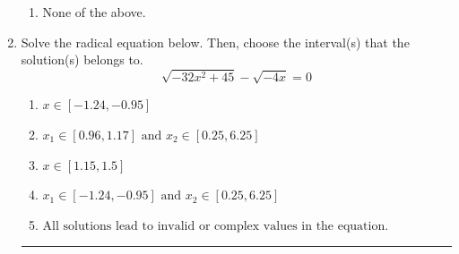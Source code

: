 \documentclass[14pt]{extbook}
\newcommand{\litem}[1]{\item#1\hspace*{-1cm}\rule{\textwidth}{0.4pt}}
\begin{document}
\begin{enumerate}
{\begin{enumerate}[label=\Alph*.]
\item None of the above.
\end{enumerate} }
\litem{
Solve the radical equation below. Then, choose the interval(s) that the solution(s) belongs to.\[ \sqrt{-32 x^2 + 45} - \sqrt{-4 x} = 0 \]\begin{enumerate}[label=\Alph*.]
\item \( x \in [-1.24,-0.95] \)
\item \( x_1 \in [0.96, 1.17] \text{ and } x_2 \in [0.25,6.25] \)
\item \( x \in [1.15,1.5] \)
\item \( x_1 \in [-1.24, -0.95] \text{ and } x_2 \in [0.25,6.25] \)
\item \( \text{All solutions lead to invalid or complex values in the equation.} \)


\end{enumerate}}
\end{enumerate}
\end{document}
